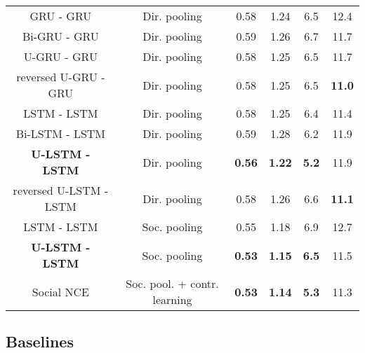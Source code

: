 \documentclass[conference]{IEEEtran}
\begin{document}
\begin{table*}[t]
\begin{center}
{\begin{tabular}{c|c|c|c|c|c}
GRU - GRU         & Dir. pooling \cite{kothari_human_2021}   & 0.58          & 1.24            & 6.5                 & 12.4      \\
Bi-GRU - GRU      & Dir. pooling \cite{kothari_human_2021}    & 0.59 & 1.26    & 6.7           & 11.7   \\ 
U-GRU - GRU       & Dir. pooling \cite{kothari_human_2021}    & 0.58 & 1.25     & 6.5           & 11.7   \\ 
reversed U-GRU - GRU       & Dir. pooling \cite{kothari_human_2021}    & 0.58 & 1.25  & 6.5           & \textbf{11.0}  \\ 
LSTM - LSTM     & Dir. pooling \cite{kothari_human_2021}    & 0.58          & 1.25            & 6.4                &  11.4       \\
Bi-LSTM - LSTM      & Dir. pooling \cite{kothari_human_2021}    & 0.59 & 1.28    & 6.2           & 11.9  \\
\textbf{U-LSTM - LSTM}     & Dir. pooling \cite{kothari_human_2021}    & \textbf{0.56}          & \textbf{1.22}            & \textbf{5.2}                & 11.9 \\
reversed U-LSTM - LSTM       & Dir. pooling \cite{kothari_human_2021}    & 0.58  & 1.26   & 6.6 & \textbf{11.1}   \\ \hdashline
LSTM - LSTM     & Soc. pooling \cite{alahi_social_2016}    & 0.55         & 1.18            & 6.9                &  12.7       \\
\textbf{U-LSTM - LSTM}     & Soc. pooling \cite{alahi_social_2016}    & \textbf{0.53}          & \textbf{1.15}            & \textbf{6.5}                & 11.5 \\

\hdashline
Social NCE \cite{liu_social_2020} & Soc. pool. \cite{alahi_social_2016} + contr. learning  & \textbf{0.53}          & \textbf{1.14}            & \textbf{5.3}                & 11.3       \\

\bottomrule
\end{tabular}
\label{tab2}}
\end{center}
\end{table*}


\subsection{Baselines}
\end{document}
